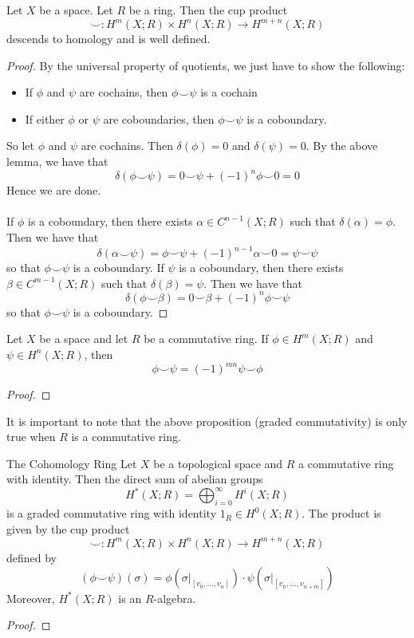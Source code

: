 \documentclass[a4paper]{article}
\begin{document}
\begin{prp}{}{} Let $X$ be a space. Let $R$ be a ring. Then the cup product $$\smile:H^m(X;R)\times H^n(X;R)\to H^{m+n}(X;R)$$ descends to homology and is well defined. \tcbline
\begin{proof}
By the universal property of quotients, we just have to show the following: 
\begin{itemize}
\item If $\phi$ and $\psi$ are cochains, then $\phi\smile\psi$ is a cochain
\item If either $\phi$ or $\psi$ are coboundaries, then $\phi\smile\psi$ is a coboundary. 
\end{itemize}
So let $\phi$ and $\psi$ are cochains. Then $\delta(\phi)=0$ and $\delta(\psi)=0$. By the above lemma, we have that $$\delta(\phi\smile\psi)=0\smile\psi+(-1)^n\phi\smile 0=0$$ Hence we are done. \\~\\

If $\phi$ is a coboundary, then there exists $\alpha\in C^{n-1}(X;R)$ such that $\delta(\alpha)=\phi$. Then we have that $$\delta(\alpha\smile\psi)=\phi\smile\psi+(-1)^{n-1}\alpha\smile 0=\psi\smile\psi$$ so that $\phi\smile\psi$ is a coboundary. If $\psi$ is a coboundary, then there exists $\beta\in C^{m-1}(X;R)$ such that $\delta(\beta)=\psi$. Then we have that $$\delta(\phi\smile\beta)=0\smile\beta+(-1)^n\phi\smile\psi$$ so that $\phi\smile\psi$ is a coboundary. 
\end{proof}
\end{prp}

\begin{prp}{}{} Let $X$ be a space and let $R$ be a commutative ring. If $\phi\in H^m(X;R)$ and $\psi\in H^n(X;R)$, then $$\phi\smile\psi=(-1)^{mn}\psi\smile\phi$$ \tcbline
\begin{proof}

\end{proof}
\end{prp}

It is important to note that the above proposition (graded commutativity) is only true when $R$ is a commutative ring. 

\begin{thm}{The Cohomology Ring}{} Let $X$ be a topological space and $R$ a commutative ring with identity. Then the direct sum of abelian groups $$H^\ast(X;R)=\bigoplus_{i=0}^\infty H^i(X;R)$$ is a graded commutative ring with identity $1_R\in H^0(X;R)$. The product is given by the cup product $$\smile:H^m(X;R)\times H^n(X;R)\to H^{m+n}(X;R)$$ defined by $$(\phi\smile\psi)(\sigma)=\phi(\sigma|_{[v_0,\dots,v_n]})\cdot\psi(\sigma|_{[v_n,\dots,v_{n+m}]})$$ Moreover, $H^\ast(X;R)$ is an $R$-algebra. \tcbline
\begin{proof}
\end{proof}
\end{thm}
\end{document}
